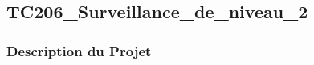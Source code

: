 \documentclass[a4paper,12pt]{report}
\begin{document}
\newpage
\subsection{TC206\_Surveillance\_de\_niveau\_2}
\begin{center}
\label{}
\end{center}
\subsubsection{Description du Projet}
\end{document}
